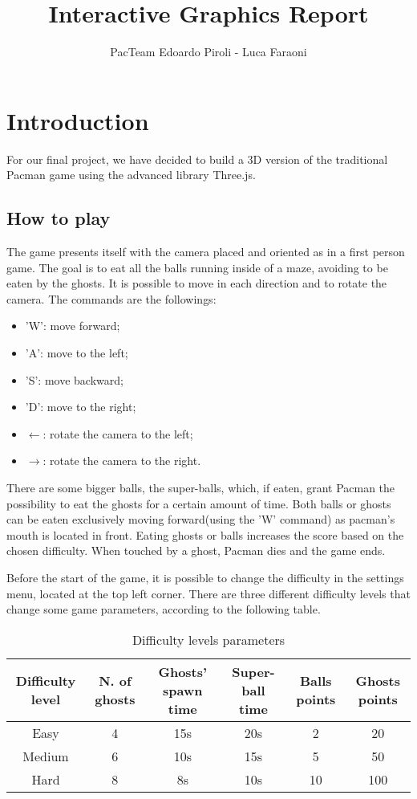\documentclass[a4paper,oneside]{report}
\title{Interactive Graphics Report}
\author{PacTeam \cr Edoardo Piroli - Luca Faraoni}
\begin{document}
\maketitle
\tableofcontents

\chapter{Introduction}

For our final project, we have decided to build a 3D version of the traditional Pacman game using the advanced library Three.js. 

\section{How to play}
The game presents itself with the camera placed and oriented as in a first person game. The goal is to eat all the balls running inside of a maze, avoiding to be eaten by the ghosts. It is possible to move in each direction and to rotate the camera. The commands are the followings:
\begin{itemize}
\item 'W': move forward;
\item 'A': move to the left;
\item 'S': move backward;
\item 'D': move to the right;
\item $\leftarrow$: rotate the camera to the left;
\item $\rightarrow$: rotate the camera to the right.
\end{itemize}

There are some bigger balls, the super-balls, which, if eaten, grant Pacman the possibility to eat the ghosts for a certain amount of time. Both balls or ghosts can be eaten exclusively moving forward(using the 'W' command) as pacman's mouth is located in front. Eating ghosts or balls increases the score based on the chosen difficulty. When touched by a ghost, Pacman dies and the game ends.

Before the start of the game, it is possible to change the difficulty in the settings menu, located at the top left corner. There are three different difficulty levels that change some game parameters, according to the following table.
\begin{table}[H]
\caption{Difficulty levels parameters}
\begin{center}
\begin{tabular}{|c|c|c|c|c|c|}
\hline
\textbf{Difficulty level} & \textbf{N. of ghosts} & \textbf{Ghosts' spawn time} & \textbf{Super-ball time} & \textbf{Balls points} & \textbf{Ghosts points} \\
\hline
Easy & 4 & 15s & 20s & 2 & 20 \\
\hline
Medium & 6 & 10s & 15s & 5 & 50 \\
\hline
Hard & 8 & 8s & 10s & 10 & 100 \\
\hline
\end{tabular}
\end{center}
\end{table}
\end{document}
